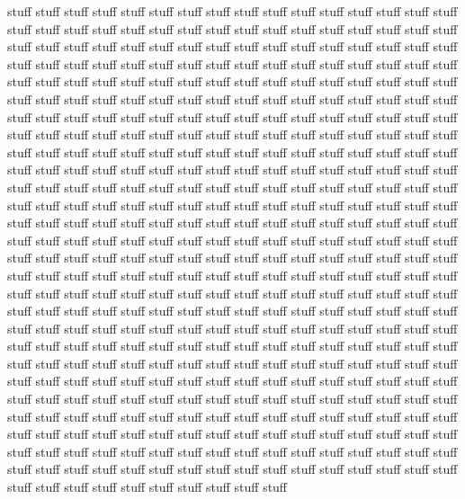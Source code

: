 \documentclass[dissertation, proposal]{bsu-cs}  %
\begin{document}
stuff stuff stuff stuff stuff stuff stuff stuff stuff stuff stuff stuff stuff
stuff stuff stuff stuff stuff stuff stuff stuff stuff stuff stuff stuff stuff
stuff stuff stuff stuff stuff stuff stuff stuff stuff stuff stuff stuff stuff
stuff stuff stuff stuff stuff stuff stuff stuff stuff stuff stuff stuff stuff
stuff stuff stuff stuff stuff stuff stuff stuff stuff stuff stuff stuff stuff
stuff stuff stuff stuff stuff stuff stuff stuff stuff stuff stuff stuff stuff
stuff stuff stuff stuff stuff stuff stuff stuff stuff stuff stuff stuff stuff
stuff stuff stuff stuff stuff stuff stuff stuff stuff stuff stuff stuff stuff
stuff stuff stuff stuff stuff stuff stuff stuff stuff stuff stuff stuff stuff
stuff stuff stuff stuff stuff stuff stuff stuff stuff stuff stuff stuff stuff
stuff stuff stuff stuff stuff stuff stuff stuff stuff stuff stuff stuff stuff
stuff stuff stuff stuff stuff stuff stuff stuff stuff stuff stuff stuff stuff
stuff stuff stuff stuff stuff stuff stuff stuff stuff stuff stuff stuff stuff
stuff stuff stuff stuff stuff stuff stuff stuff stuff stuff stuff stuff stuff
stuff stuff stuff stuff stuff stuff stuff stuff stuff stuff stuff stuff stuff
stuff stuff stuff stuff stuff stuff stuff stuff stuff stuff stuff stuff stuff
stuff stuff stuff stuff stuff stuff stuff stuff stuff stuff stuff stuff stuff
stuff stuff stuff stuff stuff stuff stuff stuff stuff stuff stuff stuff stuff
stuff stuff stuff stuff stuff stuff stuff stuff stuff stuff stuff stuff stuff
stuff stuff stuff stuff stuff stuff stuff stuff stuff stuff stuff stuff stuff
stuff stuff stuff stuff stuff stuff stuff stuff stuff stuff stuff stuff stuff
stuff stuff stuff stuff stuff stuff stuff stuff stuff stuff stuff stuff stuff
stuff stuff stuff stuff stuff stuff stuff stuff stuff stuff stuff stuff stuff
stuff stuff stuff stuff stuff stuff stuff stuff stuff stuff stuff stuff stuff
stuff stuff stuff stuff stuff stuff stuff stuff stuff stuff stuff stuff stuff
stuff stuff stuff stuff stuff stuff stuff stuff stuff stuff stuff stuff stuff
stuff stuff stuff stuff stuff stuff stuff stuff stuff stuff stuff stuff stuff
stuff stuff stuff stuff stuff stuff stuff stuff stuff stuff stuff stuff stuff
stuff stuff stuff stuff stuff stuff stuff stuff stuff stuff stuff stuff stuff
stuff stuff stuff stuff stuff stuff stuff stuff stuff stuff stuff stuff stuff
stuff stuff stuff stuff stuff stuff stuff stuff stuff stuff stuff stuff stuff
stuff stuff stuff stuff stuff stuff stuff stuff stuff stuff stuff stuff stuff
stuff stuff stuff stuff stuff stuff stuff stuff stuff stuff stuff stuff stuff
stuff stuff stuff stuff stuff stuff stuff stuff stuff stuff stuff stuff stuff
\end{document}
